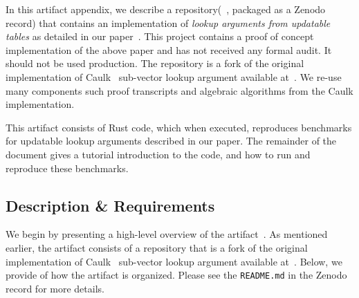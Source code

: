 \documentclass[sigconf]{acmart}
\begin{document}
	In this artifact appendix, we describe a repository(~\cite{artifact-archive}, packaged as a Zenodo record) that contains an implementation of {\em lookup arguments from updatable tables}
	as detailed in our paper~\cite{full-ver}. This project contains a proof of concept implementation of the above paper and has not received any formal audit. It should not be used production.
	The repository is a fork of the original implementation of Caulk~\cite{CCS:ZBKMNS22} sub-vector lookup argument available at~\cite{caulk-implementation}. We re-use many components such proof transcripts and algebraic algorithms from the Caulk implementation.
	
	This artifact consists of Rust code, which when executed, reproduces benchmarks for updatable lookup arguments described in our paper. The remainder of the document gives a tutorial introduction to the code, and how to run and reproduce these benchmarks.
	
	
	\subsection{Description \& Requirements}
	

	We begin by presenting a high-level overview of the artifact~\cite{artifact-archive}. As mentioned earlier, the artifact consists of a repository that is a fork of the original implementation
	of Caulk~\cite{CCS:ZBKMNS22} sub-vector lookup argument available at~\cite{caulk-implementation}. Below, we provide of how the artifact is organized. Please see the \texttt{README.md} in the
	Zenodo record for more details.
	
\end{document}
